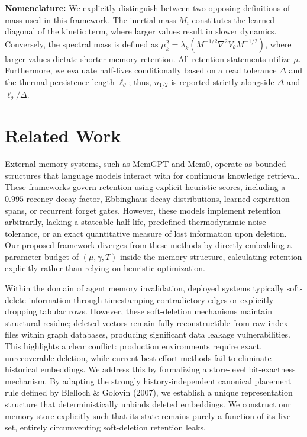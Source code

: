\documentclass{article}
\begin{document}
\textbf{Nomenclature:} We explicitly distinguish between two opposing definitions of mass used in this framework. The inertial mass $M_i$ constitutes the learned diagonal of the kinetic term, where larger values result in slower dynamics. Conversely, the spectral mass is defined as $\mu_k^2=\lambda_k(M^{-1/2}\nabla^2V_\theta M^{-1/2})$, where larger values dictate shorter memory retention. All retention statements utilize $\mu$. Furthermore, we evaluate half-lives conditionally based on a read tolerance $\Delta$ and the thermal persistence length $\ell_\theta$; thus, $n_{1/2}$ is reported strictly alongside $\Delta$ and $\ell_\theta/\Delta$.

\section{Related Work}\label{sec:related}

External memory systems, such as MemGPT and Mem0, operate as bounded structures that language models interact with for continuous knowledge retrieval. These frameworks govern retention using explicit heuristic scores, including a $0.995$ recency decay factor, Ebbinghaus decay distributions, learned expiration spans, or recurrent forget gates. However, these models implement retention arbitrarily, lacking a stateable half-life, predefined thermodynamic noise tolerance, or an exact quantitative measure of lost information upon deletion. Our proposed framework diverges from these methods by directly embedding a parameter budget of $(\mu,\gamma,T)$ inside the memory structure, calculating retention explicitly rather than relying on heuristic optimization.

Within the domain of agent memory invalidation, deployed systems typically soft-delete information through timestamping contradictory edges or explicitly dropping tabular rows. However, these soft-deletion mechanisms maintain structural residue; deleted vectors remain fully reconstructible from raw index files within graph databases, producing significant data leakage vulnerabilities. This highlights a clear conflict: production environments require exact, unrecoverable deletion, while current best-effort methods fail to eliminate historical embeddings. We address this by formalizing a store-level bit-exactness mechanism. By adapting the strongly history-independent canonical placement rule defined by Blelloch \& Golovin (2007), we establish a unique representation structure that deterministically unbinds deleted embeddings. We construct our memory store explicitly such that its state remains purely a function of its live set, entirely circumventing soft-deletion retention leaks.
\end{document}
